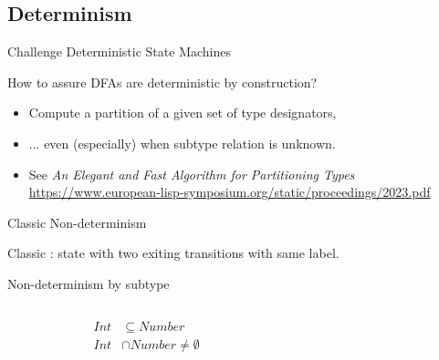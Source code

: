 \subsection{Determinism}

{  %
\begin{frame}{Challenge }{Deterministic State Machines}

  How to assure DFAs are deterministic by construction?

  \begin{itemize}
  \item   Compute a partition of a given set of type designators,
  \item   ... even (especially) when subtype relation is unknown.
  \item   See \emph{An Elegant and Fast Algorithm for Partitioning Types} \url{https://www.european-lisp-symposium.org/static/proceedings/2023.pdf}
  \end{itemize}

\end{frame}
}


\begin{frame}{Classic Non-determinism}
  \centering
  
  \scalebox{0.95}{}

  Classic : state with two exiting transitions with same label.

\end{frame}

\begin{frame}{Non-determinism by subtype}
  \begin{columns}[T]
    \begin{column}{0.4\textwidth}
      \centering
      
      \begin{align*}
        Int&\subseteq Number\\
        Int &\cap Number \neq \emptyset
      \end{align*}%
      \scalebox{0.8}{}%
    \end{column}%
    \begin{column}{0.6\textwidth}
      \only<1>{\scalebox{0.9}{}}%
      \only<3>{\scalebox{0.8}{}}%
    \end{column}
  \end{columns}
\end{frame}



